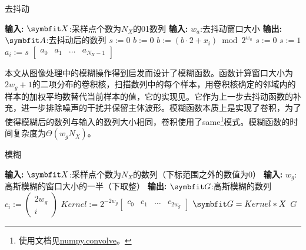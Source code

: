 {{	\begin{breakablealgorithm}
		\caption{去抖动}\label{alg:antijitter}
		\begin{algorithmic}[1]
			\Statex \textbf{输入:} $\Vector X$:采样点个数为$N_X$的01数列
			\Statex \textbf{输入:} $w_a$:去抖动窗口大小
			\Statex \textbf{输出:} $\Vector A$:去抖动后的数列
			\State $s:=0$
			\State $b:=0$
			\State $b:=(b\cdot2+x_i)\bmod 2^{w_a}$
			\State $s:=0$
			\State $s:=1$
			\EndIf
			\State $a_i:=s$
			\EndFor
			\State \Return $\begin{bmatrix}a_0&a_1&\ldots&a_{N_X-1}\end{bmatrix}$
		\end{algorithmic}
	\end{breakablealgorithm}
	
	本文从图像处理中的模糊操作得到启发而设计了模糊函数。函数计算窗口大小为$2w_g+1$的二项分布的卷积核，扫描数列中的每个样本，用卷积核确定的邻域内的样本的加权平均数替代当前样本的值，它的实现见。它作为上一步去抖动函数的补充，进一步排除噪声的干扰并保留主体波形。模糊函数本质上是实现了卷积，为了使得模糊后的数列与输入的数列大小相同，卷积使用了same\footnote{使用文档见\href{https://numpy.org/doc/stable/reference/generated/numpy.convolve.html}{numpy.convolve}。}模式。模糊函数的时间复杂度为$\Theta(w_gN_X)$。
	
	\begin{breakablealgorithm}
		\caption{模糊}\label{alg:gaussblur}
		\begin{algorithmic}[1]
			\Statex \textbf{输入:} $\Vector X$:采样点个数为$N_X$的数列（下标范围之外的数值为0）
			\Statex \textbf{输入:} $w_g$:高斯模糊的窗口大小的一半（下取整）
			\Statex \textbf{输出:} $\Vector G$:高斯模糊的数列
			\State $c_i:=\begin{pmatrix}
			2w_g\\
			i
			\end{pmatrix}$
			\EndFor
			\State $Kernel:=2^{-2w_g}\begin{bmatrix}c_0&c_1&\ldots&c_{2w_g}\end{bmatrix}$
			\State $\Vector G=Kernel*X$
			\State \Return $G$%
		\end{algorithmic}
	\end{breakablealgorithm}
	
}}
